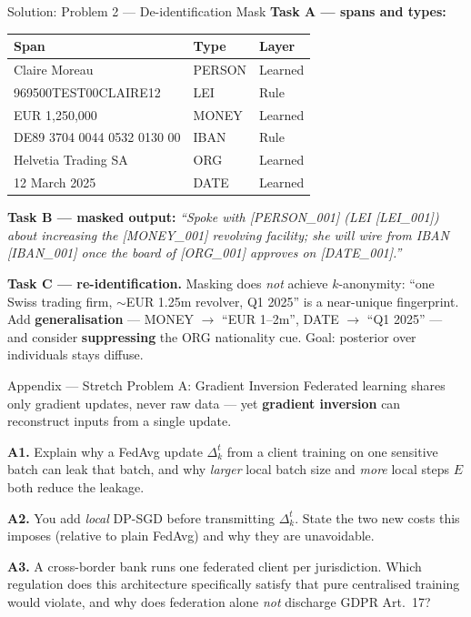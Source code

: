 \documentclass[9pt,t]{beamer}
\begin{document}
\begin{frame}{Solution: Problem 2 --- De-identification Mask}
\textbf{Task A --- spans and types:}
\footnotesize
\begin{tabular}{lll}
\toprule
Span & Type & Layer \\
\midrule
Claire Moreau & PERSON & Learned \\
969500TEST00CLAIRE12 & LEI & Rule \\
EUR 1,250,000 & MONEY & Learned \\
DE89 3704 0044 0532 0130 00 & IBAN & Rule \\
Helvetia Trading SA & ORG & Learned \\
12 March 2025 & DATE & Learned \\
\bottomrule
\end{tabular}

\medskip
\normalsize
\textbf{Task B --- masked output:}
\footnotesize
\emph{``Spoke with [PERSON\_001] (LEI [LEI\_001]) about increasing the [MONEY\_001]
revolving facility; she will wire from IBAN [IBAN\_001] once the board of [ORG\_001]
approves on [DATE\_001].''}

\medskip
\normalsize
\textbf{Task C --- re-identification.} Masking does \emph{not} achieve $k$-anonymity:
``one Swiss trading firm, $\sim$EUR 1.25m revolver, Q1 2025'' is a near-unique
fingerprint. Add \textbf{generalisation} --- MONEY $\to$ ``EUR 1--2m'', DATE $\to$
``Q1 2025'' --- and consider \textbf{suppressing} the ORG nationality cue. Goal:
posterior over individuals stays diffuse.
\end{frame}


\begin{frame}[noframenumbering]{Appendix --- Stretch Problem A: Gradient Inversion}
Federated learning shares only gradient updates, never raw data --- yet
\textbf{gradient inversion} can reconstruct inputs from a single update.

\medskip
\textbf{A1.} Explain why a FedAvg update $\Delta_k^t$ from a client training on one
sensitive batch can leak that batch, and why \emph{larger} local batch size and
\emph{more} local steps $E$ both reduce the leakage.

\medskip
\textbf{A2.} You add \emph{local} DP-SGD before transmitting $\Delta_k^t$. State the
two new costs this imposes (relative to plain FedAvg) and why they are unavoidable.

\medskip
\textbf{A3.} A cross-border bank runs one federated client per jurisdiction. Which
regulation does this architecture specifically satisfy that pure centralised training
would violate, and why does federation alone \emph{not} discharge GDPR Art.\ 17?
\end{frame}
\end{document}
